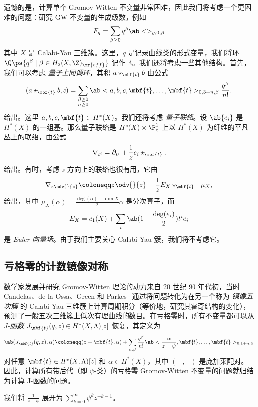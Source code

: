 遗憾的是，计算单个 Gromov-Witten 不变量非常困难，因此我们将考虑一个更困难的问题：研究 GW 不变量的生成级数，例如
\[ F_g = \sum_{\beta \geq 0} q^{\beta} \ab<>_{g,0,\beta} \]
其中 \(X\) 是 Calabi-Yau 三维簇。这里，\(q\) 是记录曲线类的形式变量，我们将环 \(\Q\ps{q^{\beta} \mid \beta \in H_2(X, \Z)_{\mr{eff}}}\) 记作 \(\Lambda\)。我们还将考虑一些其他结构。首先，我们可以考虑 \textit{量子上同调环}，其积 \(a \star_{\mbf{t}} b\) 由公式
\[
    (a \star_{\mbf{t}} b, c) = \sum_{\substack{\beta \geq 0 \\ n \geq 0}} \ab<a,b,c, \mbf{t}, \ldots, \mbf{t}>_{0,3+n,\beta} \frac{q^{\beta}}{n!}.
\]
给出。这里 \(a,b,c, \mbf{t} \in H^*(X)\)。我们还将考虑 \textit{量子联络}。设 \(\ab\{ e_i \}\) 是 \(H^*(X)\) 的一组基。那么量子联络是 \(H^*(X) \times \P^1_z\) 上以 \(H^*(X)\) 为纤维的平凡丛上的联络，由公式
\[ \nabla_{t^i} = \partial_{t^i} + \frac{1}{z} e_i \star_{\mbf{t}}. \]
给出。有时，考虑 \(z\)-方向上的联络也很有用，它由
\[ \nabla_{z \odv{}{z}} \coloneqq z \odv{}{z} - \frac{1}{z} E_X \star_{\mbf{t}} + \mu_X, \]
给出，其中 \(\mu_X(\alpha) = \frac{\deg(\alpha) - \dim X}{2} \alpha\) 是分次算子，而
\[ E_X = c_1(X) + \sum_i \ab(1 - \frac{\deg(e_i)}{2})t^i e_i \]
是 \textit{Euler 向量场}。由于我们主要关心 Calabi-Yau 簇，我们将不考虑它。

\subsection{亏格零的计数镜像对称}%
\label{sub:Enumerative mirror symmetry in genus zero}

数学家发展并研究 Gromov-Witten 理论的动力来自 20 世纪 90 年代初，当时 Candelas、de la Ossa、Green 和 Parkes~\cite{CandelasEtAl1991} 通过将问题转化为在另一个称为 \textit{镜像五次簇} 的 Calabi-Yau 三维簇上计算周期积分（等价地，研究其霍奇结构的变化），预测了一般五次三维簇上低次有理曲线的数目。在亏格零时，所有不变量都可以从 \textit{J-函数} \(J_{\mbf{t}}(q,z) \in H^*(X, \Lambda)[z]\) 恢复，其定义为
\[ \ab( J_{\mbf{t}}(q, z), \alpha ) \coloneqq (z + \mbf{t}, \alpha) + \sum_{n, \beta} \frac{q^{\beta}}{n!} \ab< \frac{\alpha}{z-\psi}, \mbf{t}, \ldots, \mbf{t}>_{0,1+n, \beta} \]
对任意 \(\mbf{t} \in H^*(X, \Lambda)[z]\) 和 \(\alpha \in H^*(X)\)，其中 \((-,-)\) 是庞加莱配对。因此，计算所有带后代（即 \(\psi\)-类）的亏格零 Gromov-Witten 不变量的问题就归结为计算 J-函数的问题。

\begin{rmk}
    我们将 \(\frac{1}{z-\psi}\) 展开为 \(\sum_{k=0}^{\infty} \psi^k z^{-k-1}\)。
\end{rmk}

